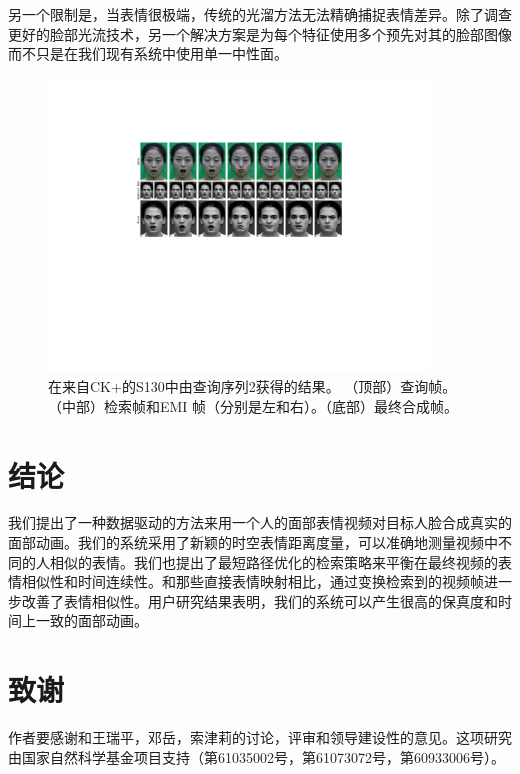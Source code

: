 另一个限制是，当表情很极端，传统的光溜方法无法精确捕捉表情差异。除了调查更好的脸部光流技术，另一个解决方案是为每个特征使用多个预先对其的脸部图像而不只是在我们现有系统中使用单一中性面。

\begin{figure}[htbp]
\centering
    \includegraphics[width=0.90\textwidth]{data/img/liwen2S130.pdf}
    \caption{在来自CK+的S130中由查询序列2获得的结果。 （顶部）查询帧。（中部）检索帧和EMI 帧（分别是左和右）。（底部）最终合成帧。}
    \label{fig:result3}
\end{figure}

\section{结论}

我们提出了一种数据驱动的方法来用一个人的面部表情视频对目标人脸合成真实的面部动画。我们的系统采用了新颖的时空表情距离度量，可以准确地测量视频中不同的人相似的表情。我们也提出了最短路径优化的检索策略来平衡在最终视频的表情相似性和时间连续性。和那些直接表情映射相比，通过变换检索到的视频帧进一步改善了表情相似性。用户研究结果表明，我们的系统可以产生很高的保真度和时间上一致的面部动画。

\section*{致谢}
作者要感谢和王瑞平，邓岳，索津莉的讨论，评审和领导建设性的意见。这项研究由国家自然科学基金项目支持（第61035002号，第61073072号，第60933006号）。

\setcounter{NAT@ctr}{0}%
\renewcommand{\refname} {参考文献}
{\small


}

